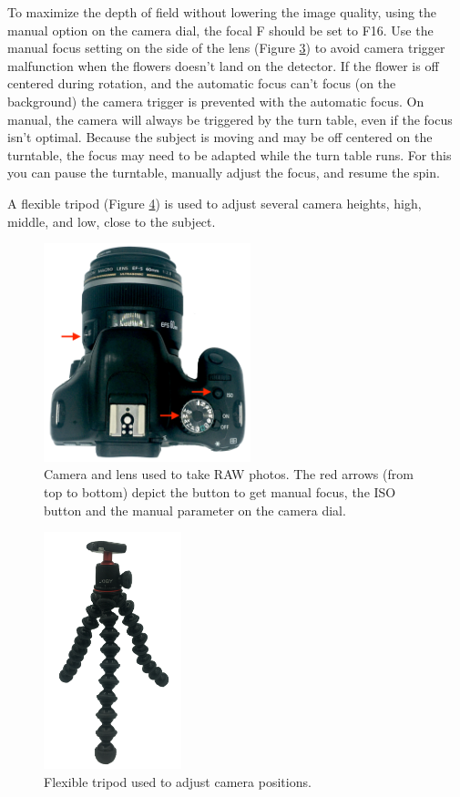 \documentclass[
]{book}
\theoremstyle{definition}
\theoremstyle{definition}
\theoremstyle{definition}
\theoremstyle{definition}
\theoremstyle{remark}
\begin{document}
To maximize the depth of field without lowering the image quality, using
the manual option on the camera dial, the focal F should be set to F16.
Use the manual focus setting on the side of the lens (Figure
\protect\hyperlink{camera_arrows}{3}) to
avoid camera trigger malfunction when the flowers doesn't land on the
detector. If the flower is off centered during rotation, and the
automatic focus can't focus (on the background) the camera trigger is
prevented with the automatic focus. On manual, the camera will always be
triggered by the turn table, even if the focus isn't optimal. Because
the subject is moving and may be off centered on the turntable, the
focus may need to be adapted while the turn table runs. For this you can
pause the turntable, manually adjust the focus, and resume the spin.

A flexible tripod (Figure \protect\hyperlink{tripod}{4}) is used to adjust several camera heights, high,
middle, and low, close to the subject.

\begin{figure}
\hypertarget{camera_arrows}{%
\centering
\includegraphics[width=6cm,height=\textheight]{Figures/camera_arrows.png}
\caption{Camera and lens used to take RAW photos. The red arrows (from top to
bottom) depict the button to get manual focus, the ISO button and the
manual parameter on the camera
dial.}\label{camera_arrows}
}
\end{figure}

\begin{figure}
\hypertarget{tripod}{%
\centering
\includegraphics[width=4cm,height=\textheight]{Figures/tripod.png}
\caption{Flexible tripod used to adjust camera
positions.}\label{tripod}
}
\end{figure}
\end{document}
